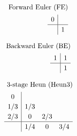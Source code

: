 \documentclass[a4paper,11pt]{article}
\theoremstyle{break}
\theoremstyle{break2}
\theoremstyle{break}
\theoremstyle{break2}
\begin{document}
\begin{center}
	\begin{minipage}{0.3\linewidth}
		\begin{align*}
		\renewcommand\arraystretch{1.2}
		\textnormal{Forward Euler (FE)} \\
		\begin{array}
		{c|c}
		0 &
		\\
		\hline
		& 1
		\end{array}
		\end{align*}
	\end{minipage}
	\begin{minipage}{0.3\linewidth}
		\begin{align*}
		\renewcommand\arraystretch{1.2}
		\textnormal{Backward Euler (BE)} \\
		\begin{array}
		{c|c}
		1 & 1
		\\
		\hline
		& 1
		\end{array}
		\end{align*}
	\end{minipage}
	\begin{minipage}{0.3\linewidth}
		\begin{align*}
		\renewcommand\arraystretch{1.2}
		\textnormal{3-stage Heun (Heun3)} \\
		\begin{array}
		{c|ccc}
		0 & & \\
		1/3 & 1/3 & \\
		2/3 & 0 & 2/3 \\
		\hline
		& 1/4 & 0 & 3/4
		\end{array}
	\end{align*}
	\end{minipage}
\end{center}
\end{document}
